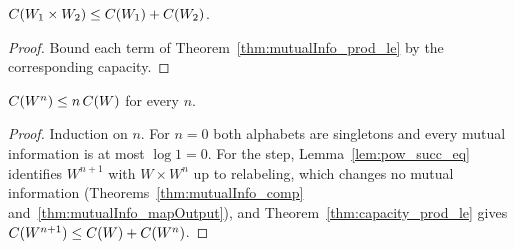 \begin{theorem}
  \label{thm:capacity_prod_le}
  \leanok
  $C(W_1 \times W_2) \le C(W_1) + C(W_2)$.
\end{theorem}
\begin{proof}
  \leanok
  Bound each term of Theorem~\ref{thm:mutualInfo_prod_le} by the corresponding capacity.
\end{proof}

\begin{theorem}
  \label{thm:capacity_pow_le}
  \leanok
  $C(W^n) \le n\, C(W)$ for every $n$.
\end{theorem}
\begin{proof}
  \leanok
  Induction on $n$.  For $n = 0$ both alphabets are singletons and every mutual information is at
  most $\log 1 = 0$.  For the step, Lemma~\ref{lem:pow_succ_eq} identifies $W^{n+1}$ with
  $W \times W^n$ up to relabeling, which changes no mutual information
  (Theorems~\ref{thm:mutualInfo_comp} and~\ref{thm:mutualInfo_mapOutput}), and
  Theorem~\ref{thm:capacity_prod_le} gives $C(W^{n+1}) \le C(W) + C(W^n)$.
\end{proof}
